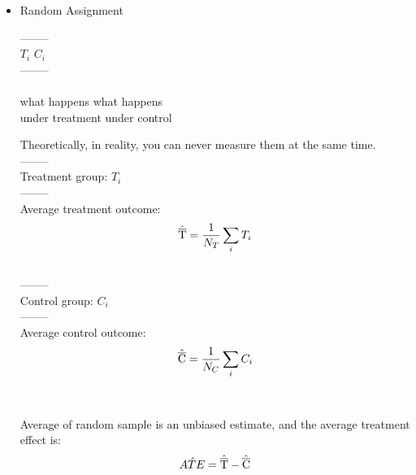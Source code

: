

\begin{itemize}
    \item Random Assignment



\begin{center}
--------\\
$T_i$ \textbar $C_i$\\
--------\\
\nearrow \hspace{1cm} \nwarrow\\
what happens    \hspace{1cm}      what happens\\
under treatment   \hspace{1cm}       under control\\
\end{center}

Theoretically, in reality, you can never measure them at the same time.\\

  \hspace*{3.6cm}  --------\\
Treatment group: \hspace{1cm}$T_i$ \textbar  \textbar \textbar \textbar\\
  \hspace*{3.6cm}  --------\\
Average treatment outcome: 
\begin{equation*}
    \hat{\overline{\rm T}} = \frac{1}{N_T} \sum_{i}^{} T_i
\end{equation*}
\\

  \hspace*{3.6cm}  --------\\
Control group: \hspace{1.3cm} \textbar  \textbar \textbar \textbar \textbar $C_i$\\
  \hspace*{3.6cm}  --------\\
Average control outcome: 
\begin{equation*}
    \hat{\overline{\rm C}} = \frac{1}{N_C} \sum_{i}^{} C_i
\end{equation*}
\\
  \\
Average of random sample is an unbiased estimate, and the average treatment effect is:
\begin{equation*}
    A\hat{T}E = \hat{\overline{\rm T}} - \hat{\overline{\rm C}}
\end{equation*}
\end{itemize}


